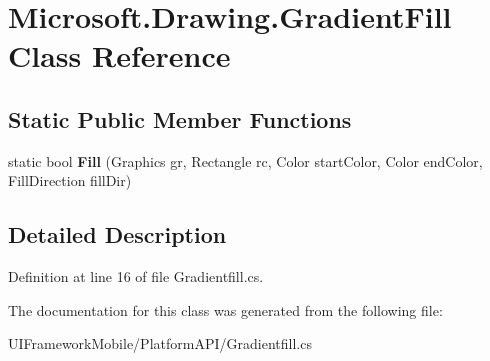 \hypertarget{class_microsoft_1_1_drawing_1_1_gradient_fill}{
\section{Microsoft.Drawing.GradientFill Class Reference}
\label{class_microsoft_1_1_drawing_1_1_gradient_fill}
}
\subsection*{Static Public Member Functions}
\begin{DoxyCompactItemize}
\item 
\hypertarget{class_microsoft_1_1_drawing_1_1_gradient_fill_a50d83aa2143ad0a0d49434c100732079}{
static bool {\bfseries Fill} (Graphics gr, Rectangle rc, Color startColor, Color endColor, FillDirection fillDir)}
\label{class_microsoft_1_1_drawing_1_1_gradient_fill_a50d83aa2143ad0a0d49434c100732079}

\end{DoxyCompactItemize}


\subsection{Detailed Description}


Definition at line 16 of file Gradientfill.cs.

The documentation for this class was generated from the following file:\begin{DoxyCompactItemize}
\item 
UIFrameworkMobile/PlatformAPI/Gradientfill.cs\end{DoxyCompactItemize}
